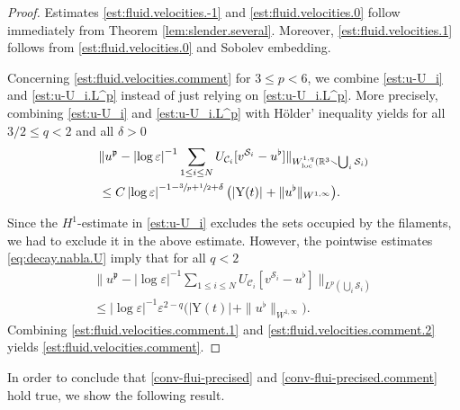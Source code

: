\documentclass[11pt]{article}
\let\oldbigcup\bigcup
\newcommand{\R}{\mathbb{R}}
\let\eps\varepsilon
\newcommand{\loc}{\mathrm{loc}}
\newcommand{\rY}{\mathrm{Y}}
\theoremstyle{definition}
\theoremstyle{remark}
\begin{document}
\begin{proof}
Estimates \eqref{est:fluid.velocities.-1} and \eqref{est:fluid.velocities.0} follow immediately from Theorem \ref{lem:slender.several}. Moreover, \eqref{est:fluid.velocities.1} follows from \eqref{est:fluid.velocities.0} and Sobolev embedding.

Concerning \eqref{est:fluid.velocities.comment} for $3 \leq p < 6$,
we combine \eqref{est:u-U_i} and \eqref{est:u-U_i.L^p} instead of just relying on \eqref{est:u-U_i.L^p}.
More precisely, combining \eqref{est:u-U_i} and \eqref{est:u-U_i.L^p} with Hölder' inequality yields for all $3/2 \leq q < 2$ and all $\delta > 0$
\begin{align} \label{est:fluid.velocities.comment.1}
&\|u^\mathfrak{p} - \left|\log \eps\right|^{-1} \sum_{1 \leq i \leq N} U_{\mathcal C_i}[v^{{\mathcal S}_i} - u^\flat]\|_{W^{1,q}_{\loc}(\R^3 \smallsetminus \oldbigcup_i \mathcal S_i)}\\
&\leq C \left|\log \eps\right|^{-1 - \sfrac 3 p + \sfrac 1 2 + \delta} \big(|\rY(t)|_{} + \|u^\flat\|_{W^{1,\infty}} \big).
\end{align}

Since the $H^1$-estimate in \eqref{est:u-U_i} excludes the sets occupied by the filaments, we had to exclude it in the above estimate. However, the pointwise estimates \eqref{eq:decay.nabla.U}
imply that for all $q < 2$\vspace*{-3pt}
\begin{multline} \label{est:fluid.velocities.comment.2}
\|u^\mathfrak{p} - \left|\log \eps\right|^{-1} \sum_{1 \leq i \leq N} U_{\mathcal C_i}[v^{{\mathcal S}_i} - u^\flat]\|_{L^p(\oldbigcup_i \mathcal S_i)}\\[-5pt]
\leq \left|\log \eps\right|^{-1} \eps^{2-q} \big(|\rY(t)|_{} + \|u^\flat\|_{W^{1,\infty}} \big).
\end{multline}
Combining \eqref{est:fluid.velocities.comment.1} and \eqref{est:fluid.velocities.comment.2} yields \eqref{est:fluid.velocities.comment}.
\end{proof}
In order to conclude that \eqref{conv-flui-precised} and \eqref{conv-flui-precised.comment} hold true, we show the following result.
\end{document}
